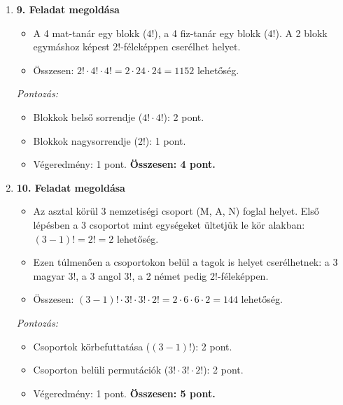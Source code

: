 \documentclass[12pt,a4paper]{article}
\begin{document}
\begin{enumerate}
    \item \textbf{9. Feladat megoldása}
    \begin{itemize}
        \item A 4 mat-tanár egy blokk ($4!$), a 4 fiz-tanár egy blokk ($4!$). A 2 blokk egymáshoz képest $2!$-féleképpen cserélhet helyet.
        \item Összesen: $2! \cdot 4! \cdot 4! = 2 \cdot 24 \cdot 24 = 1152$ lehetőség.
    \end{itemize}
    \emph{Pontozás:}
    \begin{itemize}
        \item Blokkok belső sorrendje ($4! \cdot 4!$): 2 pont.
        \item Blokkok nagysorrendje ($2!$): 1 pont.
        \item Végeredmény: 1 pont.
        \textbf{Összesen: 4 pont.}
    \end{itemize}

    \vspace{0.3cm}

    \item \textbf{10. Feladat megoldása}
    \begin{itemize}
        \item Az asztal körül 3 nemzetiségi csoport (M, A, N) foglal helyet. Első lépésben a 3 csoportot mint egységeket ültetjük le kör alakban: $(3-1)! = 2! = 2$ lehetőség.
        \item Ezen túlmenően a csoportokon belül a tagok is helyet cserélhetnek: a 3 magyar $3!$, a 3 angol $3!$, a 2 német pedig $2!$-féleképpen.
        \item Összesen: $(3-1)! \cdot 3! \cdot 3! \cdot 2! = 2 \cdot 6 \cdot 6 \cdot 2 = 144$ lehetőség.
    \end{itemize}
    \emph{Pontozás:}
    \begin{itemize}
        \item Csoportok körbefuttatása ($(3-1)!$): 2 pont.
        \item Csoporton belüli permutációk ($3! \cdot 3! \cdot 2!$): 2 pont.
        \item Végeredmény: 1 pont.
        \textbf{Összesen: 5 pont.}
    \end{itemize}

\end{enumerate}
\end{document}
